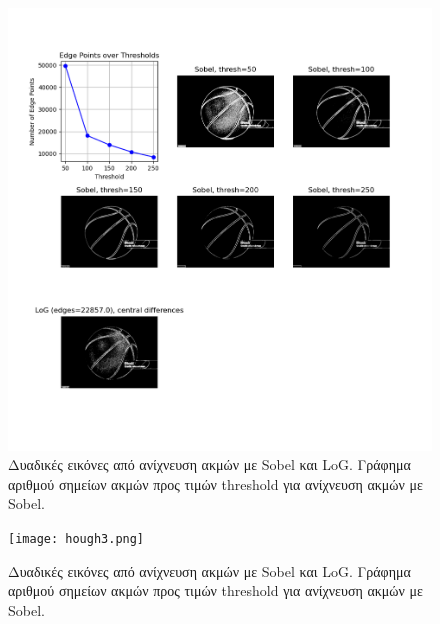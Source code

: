 \documentclass{article}
\begin{document}
\begin{figure}
    \includegraphics[width=\textwidth]{log_n_sobel.png}
    \caption{Δυαδικές εικόνες από ανίχνευση ακμών με Sobel και LoG. Γράφημα αριθμού
    σημείων ακμών προς τιμών threshold για ανίχνευση ακμών με Sobel.}\label{lognsobel}
\end{figure}

\begin{figure}
    \texttt{[image: hough3.png]}
    \caption{Δυαδικές εικόνες από ανίχνευση ακμών με Sobel και LoG. Γράφημα αριθμού
    σημείων ακμών προς τιμών threshold για ανίχνευση ακμών με Sobel.}\label{lognsobel}
\end{figure}
\end{document}
